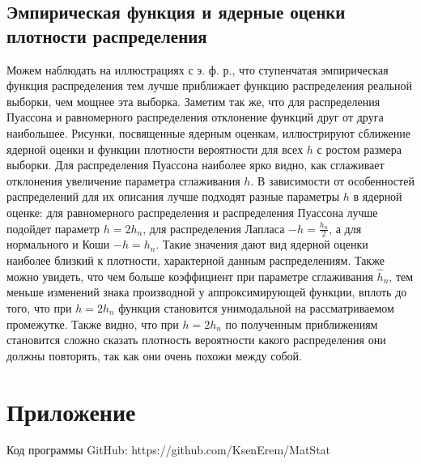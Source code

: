 \documentclass{article}
\begin{document}
\subsection{Эмпирическая функция и ядерные оценки плотности распределения}
Можем наблюдать на иллюстрациях с э. ф. р., что ступенчатая эмпирическая функция распределения тем лучше приближает функцию распределения реальной выборки, чем мощнее эта выборка. Заметим так же, что для
распределения Пуассона и равномерного распределения отклонение функций друг от друга наибольшее.
Рисунки, посвященные ядерным оценкам, иллюстрируют сближение ядерной оценки и функции плотности вероятности для всех $h$ с ростом размера
выборки. Для распределения Пуассона наиболее ярко видно, как сглаживает отклонения увеличение параметра сглаживания $h$.
В зависимости от особенностей распределений для их описания лучше подходят разные параметры $h$ в ядерной оценке: для равномерного распределения и распределения Пуассона лучше подойдет параметр $h=2h_n$, для
распределения Лапласа $-h=\frac{h_n}{2}$, а для нормального и Коши $-h=h_n$.
Такие значения дают вид ядерной оценки наиболее близкий к плотности,
характерной данным распределениям.
Также можно увидеть, что чем больше коэффициент при параметре сглаживания $\widehat{h}_n$, тем меньше изменений знака производной у аппроксимирующей функции, вплоть до того, что при $h=2h_n$ функция становится унимодальной на рассматриваемом промежутке. Также видно, что при $h=2h_n$
по полученным приближениям становится сложно сказать плотность вероятности какого распределения они должны повторять, так как они очень
похожи между собой.

\newpage

\section{Приложение}
Код программы GitHub: https://github.com/KsenErem/MatStat
\end{document}
